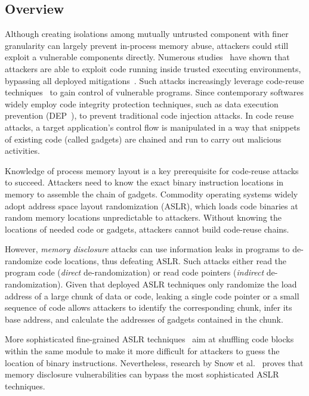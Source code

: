 \subsection{Overview}
\label{norax:sec:overview}

Although creating isolations among mutually untrusted component with finer granularity can largely prevent in-process memory abuse, attackers could still exploit a vulnerable components directly. Numerous studies~\cite{boomerang,tsgx} have shown that attackers are able to exploit code running inside trusted executing environments, bypassing all deployed mitigations~\cite{controljujutsu,jitrop,rop}. 
Such attacks increasingly leverage code-reuse techniques~\cite{rop,ret2libc,jop} to gain control of vulnerable programs.
Since contemporary softwares widely employ code integrity protection techniques, such as data execution prevention (DEP~\cite{dep}), to prevent traditional code injection attacks. 
In code reuse attacks, a target application's control flow is manipulated in a way that snippets of existing code (called gadgets) are chained and run to carry out malicious activities.

Knowledge of process memory layout is a key prerequisite for code-reuse
attacks to succeed.  Attackers need to know the exact binary instruction locations in
memory to assemble the chain of gadgets. Commodity operating systems
widely adopt address space layout randomization (ASLR), which loads code binaries at
random memory locations unpredictable to attackers. Without knowing the locations of needed
code or gadgets, attackers cannot build code-reuse chains.  

However, \emph{memory
disclosure} attacks can use information leaks in programs to de-randomize code
locations, thus defeating ASLR.  Such attacks either
 read the program code (\emph{direct} de-randomization) or read code
pointers (\emph{indirect} de-randomization).  
Given that deployed ASLR techniques only randomize the load address of a large chunk of data or code, leaking a single code pointer or a small sequence
of code allows attackers to identify the corresponding chunk, infer its base address, and calculate the addresses of gadgets contained in the chunk. 

More sophisticated fine-grained ASLR
techniques~\cite{davi2013gadge,smashinggadget, ilr,aslp,binstir} aim
at shuffling code blocks within the same module to make it more difficult for attackers
to guess the location of binary instructions. Nevertheless, research by
Snow et al.~\cite{jitrop} proves that memory disclosure vulnerabilities can
bypass the most sophisticated ASLR techniques.

